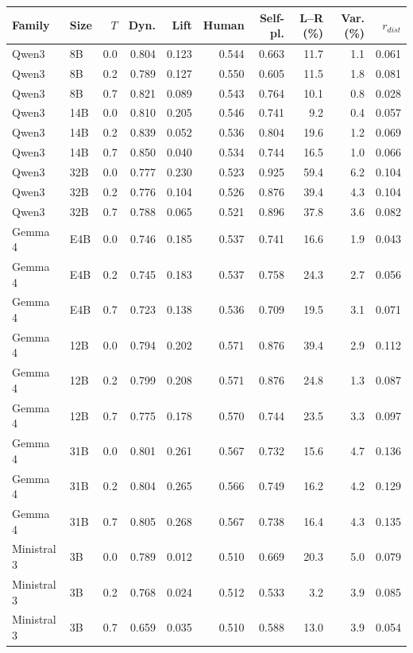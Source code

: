 \begin{tabular}{llrrrrrrrr}
\toprule
Family & Size & $T$ & Dyn. & Lift & Human & Self-pl. & L--R (\%) & Var. (\%) & $r_{dist}$ \\
\midrule
Qwen3 & 8B & 0.0 & 0.804 & 0.123 & 0.544 & 0.663 & 11.7 & 1.1 & 0.061 \\
Qwen3 & 8B & 0.2 & 0.789 & 0.127 & 0.550 & 0.605 & 11.5 & 1.8 & 0.081 \\
Qwen3 & 8B & 0.7 & 0.821 & 0.089 & 0.543 & 0.764 & 10.1 & 0.8 & 0.028 \\
Qwen3 & 14B & 0.0 & 0.810 & 0.205 & 0.546 & 0.741 & 9.2 & 0.4 & 0.057 \\
Qwen3 & 14B & 0.2 & 0.839 & 0.052 & 0.536 & 0.804 & 19.6 & 1.2 & 0.069 \\
Qwen3 & 14B & 0.7 & 0.850 & 0.040 & 0.534 & 0.744 & 16.5 & 1.0 & 0.066 \\
Qwen3 & 32B & 0.0 & 0.777 & 0.230 & 0.523 & 0.925 & 59.4 & 6.2 & 0.104 \\
Qwen3 & 32B & 0.2 & 0.776 & 0.104 & 0.526 & 0.876 & 39.4 & 4.3 & 0.104 \\
Qwen3 & 32B & 0.7 & 0.788 & 0.065 & 0.521 & 0.896 & 37.8 & 3.6 & 0.082 \\
Gemma 4 & E4B & 0.0 & 0.746 & 0.185 & 0.537 & 0.741 & 16.6 & 1.9 & 0.043 \\
Gemma 4 & E4B & 0.2 & 0.745 & 0.183 & 0.537 & 0.758 & 24.3 & 2.7 & 0.056 \\
Gemma 4 & E4B & 0.7 & 0.723 & 0.138 & 0.536 & 0.709 & 19.5 & 3.1 & 0.071 \\
Gemma 4 & 12B & 0.0 & 0.794 & 0.202 & 0.571 & 0.876 & 39.4 & 2.9 & 0.112 \\
Gemma 4 & 12B & 0.2 & 0.799 & 0.208 & 0.571 & 0.876 & 24.8 & 1.3 & 0.087 \\
Gemma 4 & 12B & 0.7 & 0.775 & 0.178 & 0.570 & 0.744 & 23.5 & 3.3 & 0.097 \\
Gemma 4 & 31B & 0.0 & 0.801 & 0.261 & 0.567 & 0.732 & 15.6 & 4.7 & 0.136 \\
Gemma 4 & 31B & 0.2 & 0.804 & 0.265 & 0.566 & 0.749 & 16.2 & 4.2 & 0.129 \\
Gemma 4 & 31B & 0.7 & 0.805 & 0.268 & 0.567 & 0.738 & 16.4 & 4.3 & 0.135 \\
Ministral 3 & 3B & 0.0 & 0.789 & 0.012 & 0.510 & 0.669 & 20.3 & 5.0 & 0.079 \\
Ministral 3 & 3B & 0.2 & 0.768 & 0.024 & 0.512 & 0.533 & 3.2 & 3.9 & 0.085 \\
Ministral 3 & 3B & 0.7 & 0.659 & 0.035 & 0.510 & 0.588 & 13.0 & 3.9 & 0.054 \\

\end{tabular}

